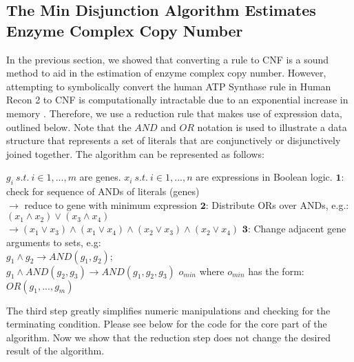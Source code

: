 \subsection{The Min Disjunction Algorithm Estimates \\Enzyme Complex Copy Number}

In the previous section, we showed that converting a rule to CNF is a
sound method to aid in the estimation of enzyme complex copy number.
However, attempting to symbolically convert the human ATP Synthase rule in
Human Recon 2 to CNF is computationally intractable due to an
exponential increase in memory \cite{Thiele2013}. Therefore, we use a
reduction rule that makes use of expression data, outlined below.
Note that the $AND$ and $OR$ notation is used to illustrate a
data structure that represents a set of literals that are
conjunctively or disjunctively joined together. The algorithm can be
represented as follows: \\

\pagebreak
\begin{Algorithm}
\label{alg:ReductionToCNF}
\begin{algorithmic}
\REQUIRE $g_i~s.t.~i \in{1, ..., m}$ are genes. 
\REQUIRE $x_i~s.t.~i \in{1, ..., n}$ are expressions in Boolean logic.
  \STATE $\mathbf{1}$: check for sequence of ANDs of literals (genes)\\ 
    \hspace{4.8 mm} $\rightarrow$ reduce to gene with minimum expression 
  \STATE $\mathbf{2}$: Distribute ORs over ANDs, e.g.: $(x_1 \land x_2) \lor (x_3 \land x_4)$ \\ 
    \hspace{4.8 mm} $\rightarrow (x_1 \lor x_3) \land (x_1 \lor x_4) \land (x_2 \lor x_3) \land (x_2 \lor x_4)$
  \STATE $\mathbf{3}$: Change adjacent gene arguments to sets, e.g: \\
    \hspace{4.8 mm} $g_1 \land g_2 \rightarrow AND(g_1,g_2)$;  \\
    \hspace{4.8 mm} $g_1 \land AND(g_2,g_3) \rightarrow AND(g_1,g_2,g_3)$ 
\ENDWHILE
\ENSURE $o_{min}$ where $o_{min}$ has the form: $OR(g_1,...,g_m)$
\end{algorithmic} 
\end{Algorithm}

The third step greatly simplifies numeric manipulations and checking
for the terminating condition. Please see below for the code for the
core part of the algorithm. Now we show that the reduction step does
not change the desired result of the algorithm.


